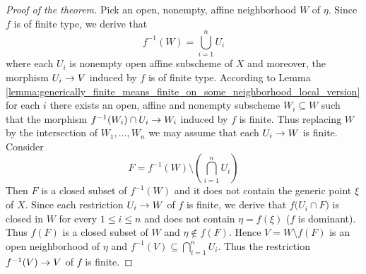\begin{proof}[Proof of the theorem]
Pick an open, nonempty, affine neighborhood $W$ of $\eta$. Since $f$ is of finite type, we derive that
$$f^{-1}(W) = \bigcup_{i=1}^nU_i$$
where each $U_i$ is nonempty open affine subscheme of $X$ and moreover, the morphism $U_i\rightarrow V$ induced by $f$ is of finite type. According to Lemma \ref{lemma:generically_finite_means_finite_on_some_neighborhood_local_version} for each $i$ there exists an open, affine and nonempty subscheme $W_i\subseteq W$ such that the morphism $f^{-1}(W_i)\cap U_i\rightarrow W_i$ induced by $f$ is finite. Thus replacing $W$ by the intersection of $W_1,...,W_n$ we may assume that each $U_i\rightarrow W$ is finite. Consider
$$F = f^{-1}(W) \setminus \left(\bigcap_{i=1}^nU_i\right)$$
Then $F$ is a closed subset of $f^{-1}(W)$ and it does not contain the generic point $\xi$ of $X$. Since each restriction $U_i\rightarrow W$ of $f$ is finite, we derive that $f\big(U_i\cap F\big)$ is closed in $W$ for every $1\leq i\leq n$ and does not contain $\eta = f(\xi)$ ($f$ is dominant). Thus $f(F)$ is a closed subset of $W$ and $\eta \not \in f(F)$. Hence $V = W\setminus f(F)$ is an open neighborhood of $\eta$ and $f^{-1}(V) \subseteq \bigcap_{i=1}^nU_i$. Thus the restriction $f^{-1}(V)\rightarrow V$ of $f$ is finite.
\end{proof}

